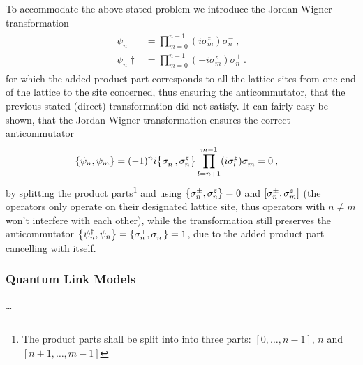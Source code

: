 \documentclass[../main.tex]{subfiles} %
\begin{document}
To accommodate the above stated problem we introduce the Jordan-Wigner transformation
\begin{align} \label{eq:Jordan-WignerTransformation}
\begin{split}
    \psi_n &= \prod_{m=0}^{n-1} (i\sigma_m^z) \sigma_n^- \: , \\
    \psi_n\dagger &= \prod_{m=0}^{n-1} (-i\sigma_m^z) \sigma_n^+ \: .
\end{split}
\end{align}
for which the added product part corresponds to all the lattice sites from one end of the lattice to the site concerned, thus ensuring the anticommutator, that the previous stated (direct) transformation did not satisfy. It can fairly easy be shown, that the Jordan-Wigner transformation ensures the correct anticommutator
\begin{align}
    \anticommutator{\psi_n}{\psi_m} &= (-1)^n i \anticommutator{\sigma_n^-}{\sigma_n^z} \prod_{l=n+1}^{m-1} (i \sigma_l^z) \sigma_m^- = 0 \: ,
\end{align}
by splitting the product parts\footnote{The product parts shall be split into into three parts: $[0,\ldots,n-1]$, $n$ and $[n+1,\ldots,m-1]$} and using $\anticommutator{\sigma_n^\pm}{\sigma_n^z} = 0$ and $\commutator{\sigma_n^\pm}{\sigma_m^z}$ (the operators only operate on their designated lattice site, thus operators with $n \ne m$ won't interfere with each other), while the transformation still preserves the anticommutator $\anticommutator{\psi_n\dagger}{\psi_n} = \anticommutator{\sigma_n^+}{\sigma_n^-} = 1$, due to the added product part cancelling with itself.



\subsubsection{Quantum Link Models}

\ldots
\end{document}
